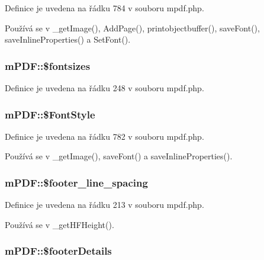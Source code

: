 Definice je uvedena na řádku 784 v souboru mpdf.\-php.



Používá se v \-\_\-get\-Image(), Add\-Page(), printobjectbuffer(), save\-Font(), save\-Inline\-Properties() a Set\-Font().

\hypertarget{classm_p_d_f_ad6aa3461608322604e993c1d6ee9d142}{
\subsubsection[{\$fontsizes}]{\setlength{\rightskip}{0pt plus 5cm}m\-P\-D\-F\-::\$fontsizes}}\label{classm_p_d_f_ad6aa3461608322604e993c1d6ee9d142}


Definice je uvedena na řádku 248 v souboru mpdf.\-php.

\hypertarget{classm_p_d_f_a9eb5f21f34b2cf8a4d0045a7923bc87c}{
\subsubsection[{\$\-Font\-Style}]{\setlength{\rightskip}{0pt plus 5cm}m\-P\-D\-F\-::\$\-Font\-Style}}\label{classm_p_d_f_a9eb5f21f34b2cf8a4d0045a7923bc87c}


Definice je uvedena na řádku 782 v souboru mpdf.\-php.



Používá se v \-\_\-get\-Image(), save\-Font() a save\-Inline\-Properties().

\hypertarget{classm_p_d_f_a60a5cc605138f8bd010b806b6f42a307}{
\subsubsection[{\$footer\-\_\-line\-\_\-spacing}]{\setlength{\rightskip}{0pt plus 5cm}m\-P\-D\-F\-::\$footer\-\_\-line\-\_\-spacing}}\label{classm_p_d_f_a60a5cc605138f8bd010b806b6f42a307}


Definice je uvedena na řádku 213 v souboru mpdf.\-php.



Používá se v \-\_\-get\-H\-F\-Height().

\hypertarget{classm_p_d_f_a125a3bfb0067de7a1a750008c23d3ccd}{
\subsubsection[{\$footer\-Details}]{\setlength{\rightskip}{0pt plus 5cm}m\-P\-D\-F\-::\$footer\-Details}}\label{classm_p_d_f_a125a3bfb0067de7a1a750008c23d3ccd}


